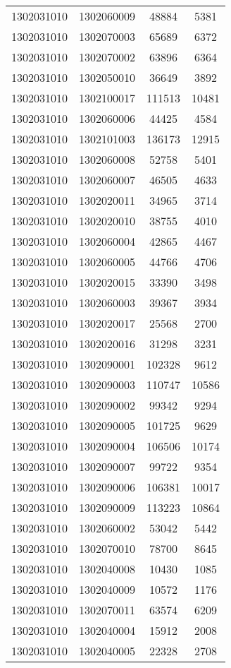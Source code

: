 \begin{longtable}{llcc}
1302031010 & 1302060009 & 48884 & 5381\\
1302031010 & 1302070003 & 65689 & 6372\\
1302031010 & 1302070002 & 63896 & 6364\\
1302031010 & 1302050010 & 36649 & 3892\\
1302031010 & 1302100017 & 111513 & 10481\\
1302031010 & 1302060006 & 44425 & 4584\\
1302031010 & 1302101003 & 136173 & 12915\\
1302031010 & 1302060008 & 52758 & 5401\\
1302031010 & 1302060007 & 46505 & 4633\\
1302031010 & 1302020011 & 34965 & 3714\\
1302031010 & 1302020010 & 38755 & 4010\\
1302031010 & 1302060004 & 42865 & 4467\\
1302031010 & 1302060005 & 44766 & 4706\\
1302031010 & 1302020015 & 33390 & 3498\\
1302031010 & 1302060003 & 39367 & 3934\\
1302031010 & 1302020017 & 25568 & 2700\\
1302031010 & 1302020016 & 31298 & 3231\\
1302031010 & 1302090001 & 102328 & 9612\\
1302031010 & 1302090003 & 110747 & 10586\\
1302031010 & 1302090002 & 99342 & 9294\\
1302031010 & 1302090005 & 101725 & 9629\\
1302031010 & 1302090004 & 106506 & 10174\\
1302031010 & 1302090007 & 99722 & 9354\\
1302031010 & 1302090006 & 106381 & 10017\\
1302031010 & 1302090009 & 113223 & 10864\\
1302031010 & 1302060002 & 53042 & 5442\\
1302031010 & 1302070010 & 78700 & 8645\\
1302031010 & 1302040008 & 10430 & 1085\\
1302031010 & 1302040009 & 10572 & 1176\\
1302031010 & 1302070011 & 63574 & 6209\\
1302031010 & 1302040004 & 15912 & 2008\\
1302031010 & 1302040005 & 22328 & 2708\\

\end{longtable}
